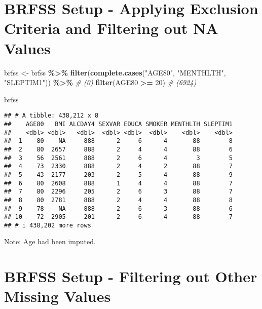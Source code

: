 \documentclass[
]{article}
\newenvironment{Shaded}{\begin{snugshade}}{\end{snugshade}}
\newcommand{\CommentTok}[1]{\textcolor[rgb]{0.56,0.35,0.01}{\textit{#1}}}
\newcommand{\DecValTok}[1]{\textcolor[rgb]{0.00,0.00,0.81}{#1}}
\newcommand{\FunctionTok}[1]{\textcolor[rgb]{0.13,0.29,0.53}{\textbf{#1}}}
\newcommand{\NormalTok}[1]{#1}
\newcommand{\OtherTok}[1]{\textcolor[rgb]{0.56,0.35,0.01}{#1}}
\newcommand{\SpecialCharTok}[1]{\textcolor[rgb]{0.81,0.36,0.00}{\textbf{#1}}}
\newcommand{\StringTok}[1]{\textcolor[rgb]{0.31,0.60,0.02}{#1}}
\begin{document}
\section{BRFSS Setup - Applying Exclusion Criteria and Filtering out NA
Values}\label{brfss-setup---applying-exclusion-criteria-and-filtering-out-na-values}

\begin{Shaded}
\begin{Highlighting}[]
\NormalTok{brfss }\OtherTok{\textless{}{-}}\NormalTok{ brfss }\SpecialCharTok{\%\textgreater{}\%} 
  \FunctionTok{filter}\NormalTok{(}\FunctionTok{complete.cases}\NormalTok{(}\StringTok{"AGE80"}\NormalTok{, }\StringTok{"MENTHLTH"}\NormalTok{, }\StringTok{"SLEPTIM1"}\NormalTok{)) }\SpecialCharTok{\%\textgreater{}\%} \CommentTok{\# (0)}
  \FunctionTok{filter}\NormalTok{(AGE80 }\SpecialCharTok{\textgreater{}=} \DecValTok{20}\NormalTok{) }\CommentTok{\# (6924)}

\NormalTok{brfss}
\end{Highlighting}
\end{Shaded}

\begin{verbatim}
## # A tibble: 438,212 x 8
##    AGE80   BMI ALCDAY4 SEXVAR EDUCA SMOKER MENTHLTH SLEPTIM1
##    <dbl> <dbl>   <dbl>  <dbl> <dbl>  <dbl>    <dbl>    <dbl>
##  1    80    NA     888      2     6      4       88        8
##  2    80  2657     888      2     4      4       88        6
##  3    56  2561     888      2     6      4        3        5
##  4    73  2330     888      2     4      2       88        7
##  5    43  2177     203      2     5      4       88        9
##  6    80  2608     888      1     4      4       88        7
##  7    80  2296     205      2     6      3       88        7
##  8    80  2781     888      2     4      4       88        8
##  9    78    NA     888      2     6      3       88        6
## 10    72  2905     201      2     6      4       88        7
## # i 438,202 more rows
\end{verbatim}

Note: Age had been imputed.

\section{BRFSS Setup - Filtering out Other Missing
Values}\label{brfss-setup---filtering-out-other-missing-values}
\end{document}
